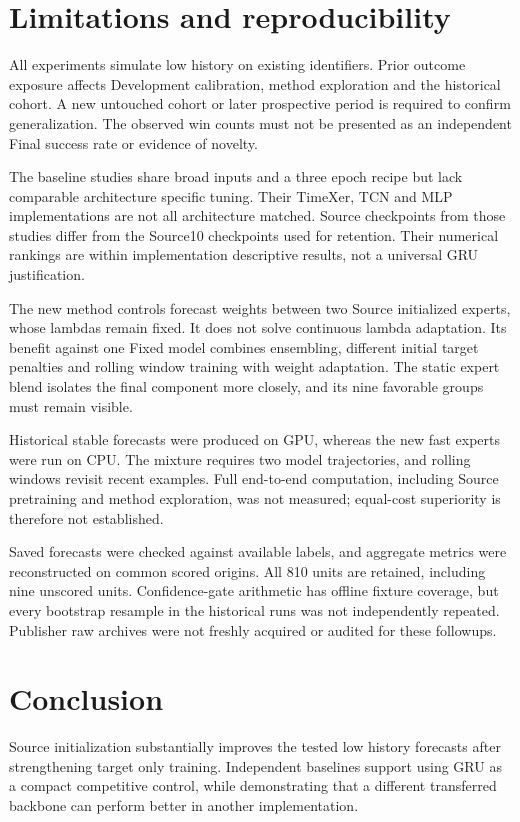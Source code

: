\documentclass[pdflatex,iicol,sn-mathphys-num]{sn-jnl}
\begin{document}
\section{Limitations and reproducibility}

All experiments simulate low history on existing identifiers. Prior outcome exposure affects Development calibration, method exploration and the historical cohort. A new untouched cohort or later prospective period is required to confirm generalization. The observed win counts must not be presented as an independent Final success rate or evidence of novelty.

The baseline studies share broad inputs and a three epoch recipe but lack comparable architecture specific tuning. Their TimeXer, TCN and MLP implementations are not all architecture matched. Source checkpoints from those studies differ from the Source10 checkpoints used for retention. Their numerical rankings are within implementation descriptive results, not a universal GRU justification.

The new method controls forecast weights between two Source initialized experts, whose lambdas remain fixed. It does not solve continuous lambda adaptation. Its benefit against one Fixed model combines ensembling, different initial target penalties and rolling window training with weight adaptation. The static expert blend isolates the final component more closely, and its nine favorable groups must remain visible.

Historical stable forecasts were produced on GPU, whereas the new fast experts were run on CPU. The mixture requires two model trajectories, and rolling windows revisit recent examples. Full end-to-end computation, including Source pretraining and method exploration, was not measured; equal-cost superiority is therefore not established.

Saved forecasts were checked against available labels, and aggregate metrics were reconstructed on common scored origins. All 810 units are retained, including nine unscored units. Confidence-gate arithmetic has offline fixture coverage, but every bootstrap resample in the historical runs was not independently repeated. Publisher raw archives were not freshly acquired or audited for these followups.

\section{Conclusion}

Source initialization substantially improves the tested low history forecasts after strengthening target only training. Independent baselines support using GRU as a compact competitive control, while demonstrating that a different transferred backbone can perform better in another implementation.
\end{document}

